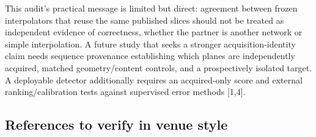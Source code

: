 \documentclass[
]{article}
\begin{document}
This audit's practical message is limited but direct: agreement between
frozen interpolators that reuse the same published slices should not be
treated as independent evidence of correctness, whether the partner is
another network or simple interpolation. A future study that seeks a
stronger acquisition-identity claim needs sequence provenance
establishing which planes are independently acquired, matched
geometry/content controls, and a prospectively isolated target. A
deployable detector additionally requires an acquired-only score and
external ranking/calibration tests against supervised error methods
{[}1,4{]}.

\subsection{References to verify in venue
style}\label{references-to-verify-in-venue-style}
\end{document}
